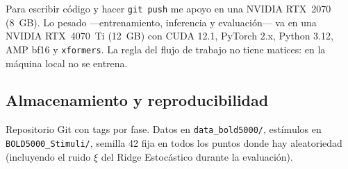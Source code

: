 Para escribir código y hacer \texttt{git push} me apoyo en una NVIDIA RTX~2070 (8~GB). Lo 
pesado ---entrenamiento, inferencia y evaluación--- va en una NVIDIA RTX~4070~Ti (12~GB) con 
CUDA 12.1, PyTorch 2.x, Python 3.12, AMP bf16 y \texttt{xformers}. La regla del flujo de 
trabajo no tiene matices: en la máquina local no se entrena.

\subsection{Almacenamiento y reproducibilidad}

Repositorio Git con tags por fase. Datos en \texttt{data\_bold5000/}, estímulos en \texttt{
BOLD5000\_Stimuli/}, semilla 42 fija en todos los puntos donde hay aleatoriedad (incluyendo 
el ruido $\xi$ del Ridge Estocástico durante la evaluación).

\afterpage{\blankpage}

